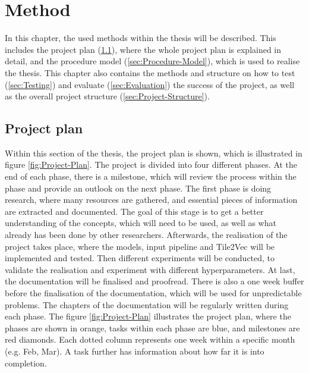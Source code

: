 \chapter{Method}
\label{ch:Method}
In this chapter, the used methods within the thesis will be described. This includes the project plan (\ref{sec:Project-Plan}), where the whole project plan is explained in detail, and the procedure model (\ref{sec:Procedure-Model}), which is used to realise the thesis. This chapter also contains the methods and structure on how to test (\ref{sec:Testing}) and evaluate (\ref{sec:Evaluation}) the success of the project, as well as the overall project structure (\ref{sec:Project-Structure}).

\section{Project plan}
\label{sec:Project-Plan}
Within this section of the thesis, the project plan is shown, which is illustrated in figure \ref{fig:Project-Plan}. The project is divided into four different phases. At the end of each phase, there is a milestone, which will review the process within the phase and provide an outlook on the next phase. The first phase is doing research, where many resources are gathered, and essential pieces of information are extracted and documented. The goal of this stage is to get a better understanding of the concepts, which will need to be used, as well as what already has been done by other researchers. Afterwards, the realisation of the project takes place, where the models, input pipeline and Tile2Vec will be implemented and tested. Then different experiments will be conducted, to validate the realisation and experiment with different hyperparameters. At last, the documentation will be finalised and proofread. There is also a one week buffer before the finalisation of the documentation, which will be used for unpredictable problems. The chapters of the documentation will be regularly written during each phase.
\newline
\newline
The figure \ref{fig:Project-Plan} illustrates the project plan, where the phases are shown in orange, tasks within each phase are blue, and milestones are red diamonds. Each dotted column represents one week within a specific month (e.g. Feb, Mar). A task further has information about how far it is into completion.

\storeareas{}
{}
\storeareas\landscapevalues

